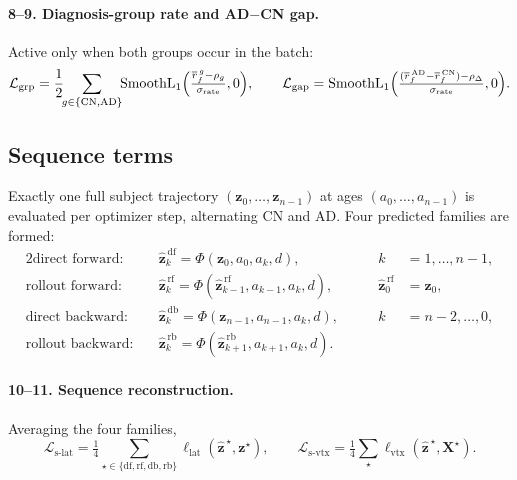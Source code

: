 \documentclass[11pt]{article}
\newcommand{\z}{\bm{z}}
\newcommand{\X}{\bm{X}}
\newcommand{\Loss}{\mathcal{L}}
\newcommand{\SL}{\operatorname{SmoothL}_1}
\begin{document}
\paragraph{8--9. Diagnosis-group rate and AD$-$CN gap.} Active only when both groups occur
in the batch:
\begin{equation}
  \Loss_{\mathrm{grp}} = \frac{1}{2}\!\!\sum_{g \in \{\mathrm{CN},\mathrm{AD}\}}\!\!
    \SL\Bigl(\tfrac{\overline{r}_f^{\,g} - \rho_g}{\sigma_{\mathrm{rate}}}, 0\Bigr),
  \qquad
  \Loss_{\mathrm{gap}} = \SL\Bigl(
    \tfrac{(\overline{r}_f^{\,\mathrm{AD}} - \overline{r}_f^{\,\mathrm{CN}}) - \rho_\Delta}
          {\sigma_{\mathrm{rate}}}, 0\Bigr).
\end{equation}

\subsection{Sequence terms}

Exactly one full subject trajectory $(\z_0,\dots,\z_{n-1})$ at ages $(a_0,\dots,a_{n-1})$ is
evaluated per optimizer step, alternating CN and AD. Four predicted families are formed:
\begin{alignat}{2}
  \text{direct forward:}\quad  &\hat{\z}^{\,\mathrm{df}}_k = \Phi(\z_0, a_0, a_k, d),
  &\qquad k &= 1,\dots,n-1, \\
  \text{rollout forward:}\quad &\hat{\z}^{\,\mathrm{rf}}_k = \Phi(\hat{\z}^{\,\mathrm{rf}}_{k-1}, a_{k-1}, a_k, d),
  &\qquad \hat{\z}^{\,\mathrm{rf}}_0 &= \z_0, \\
  \text{direct backward:}\quad &\hat{\z}^{\,\mathrm{db}}_k = \Phi(\z_{n-1}, a_{n-1}, a_k, d),
  &\qquad k &= n-2,\dots,0, \\
  \text{rollout backward:}\quad &\hat{\z}^{\,\mathrm{rb}}_k = \Phi(\hat{\z}^{\,\mathrm{rb}}_{k+1}, a_{k+1}, a_k, d).&&
\end{alignat}

\paragraph{10--11. Sequence reconstruction.} Averaging the four families,
\begin{equation}
  \Loss_{\mathrm{s\text{-}lat}} = \tfrac{1}{4}\!\!\sum_{\star \in \{\mathrm{df,rf,db,rb}\}}\!\!
    \ell_{\mathrm{lat}}(\hat{\z}^{\,\star}, \z^{\star}), \qquad
  \Loss_{\mathrm{s\text{-}vtx}} = \tfrac{1}{4}\!\!\sum_{\star}\!
    \ell_{\mathrm{vtx}}(\hat{\z}^{\,\star}, \X^{\star}).
\end{equation}
\end{document}
